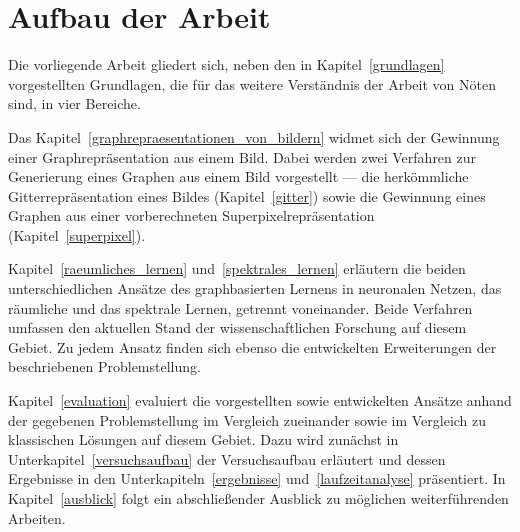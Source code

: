 \section{Aufbau der Arbeit}
\label{aufbau_der_arbeit}

Die vorliegende Arbeit gliedert sich, neben den in Kapitel~\ref{grundlagen} vorgestellten Grundlagen, die für das weitere Verständnis der Arbeit von Nöten sind, in vier Bereiche.

Das Kapitel~\ref{graphrepraesentationen_von_bildern} widmet sich der Gewinnung einer Graphrepräsentation aus einem Bild.
Dabei werden zwei Verfahren zur Generierung eines Graphen aus einem Bild vorgestellt — die herkömmliche Gitterrepräsentation eines Bildes (Kapitel~\ref{gitter}) sowie die Gewinnung eines Graphen aus einer vorberechneten Superpixelrepräsentation (Kapitel~\ref{superpixel}).

Kapitel~\ref{raeumliches_lernen} und~\ref{spektrales_lernen} erläutern die beiden unterschiedlichen Ansätze des graphbasierten Lernens in neuronalen Netzen, das räumliche und das spektrale Lernen, getrennt voneinander.
Beide Verfahren umfassen den aktuellen Stand der wissenschaftlichen Forschung auf diesem Gebiet.
Zu jedem Ansatz finden sich ebenso die entwickelten Erweiterungen \bzgl{} der beschriebenen Problemstellung.

Kapitel~\ref{evaluation} evaluiert die vorgestellten sowie entwickelten Ansätze anhand der gegebenen Problemstellung im Vergleich zueinander sowie im Vergleich zu klassischen Lösungen auf diesem Gebiet.
Dazu wird zunächst in Unterkapitel~\ref{versuchsaufbau} der Versuchsaufbau erläutert und dessen Ergebnisse in den Unterkapiteln~\ref{ergebnisse} und~\ref{laufzeitanalyse} präsentiert.
In Kapitel~\ref{ausblick} folgt ein abschließender Ausblick zu möglichen weiterführenden Arbeiten.
